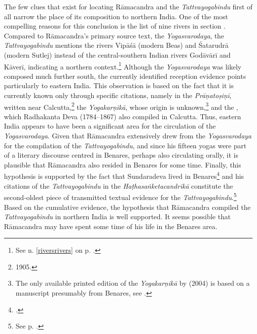 The few clues that exist for locating Rāmacandra and the \textit{Tattvayogabindu} first of all narrow the place of its composition to northern India. One of the most compelling reasons for this conclusion is the list of nine rivers in section . Compared to Rāmacandra's primary source text, the \textit{Yogasvarodaya}, the \emph{Tattvayogabindu} mentions the rivers Vipāśā (modern Beas) and Śatarudrā (modern Sutlej) instead of the central-southern Indian rivers Godāvārī and Kāverī, indicating a northern context.\footnote{See n. \ref{riversrivers} on p. \pageref{riversrivers}.} Although the \emph{Yogasvarodaya} was likely composed much further south, the currently identified reception evidence points particularly to eastern India. This observation is based on the fact that it is currently known only through specific citations, namely in the \textit{Prāṇatoṣiṇī}, written near Calcutta,\footnote{\citeauthor{shastri1905} 1905.} the \emph{Yogakarṇikā}, whose origin is unknown,\footnote{The only available printed edition of the \emph{Yogakarṇikā} by \citeauthor{yogakarnika} (2004) is based on a manuscript presumably from Benares, see \citeauthor[2004: ]{yogakarnika}.} and the , which Radhakanta Deva (1784–1867) also compiled in Calcutta. Thus, eastern India appears to have been a significant area for the circulation of the \textit{Yogasvarodaya}.
Given that Rāmacandra extensively drew from the \textit{Yogasvarodaya} for the compilation of the \textit{Tattvayogabindu}, and since his fifteen yogas were part of a literary discourse centred in Benares, perhaps also circulating orally, it is plausible that Rāmacandra also resided in Benares for some time. Finally, this hypothesis is supported by the fact that Sundaradeva lived in Benares\footnote{\citeauthor[2018: 123]{birch2018proliferation}.} and his citations of the \emph{Tattvayogabindu} in the \emph{Haṭhasaṅketacandrikā} constitute the second-oldest piece of transmitted textual evidence for the \emph{Tattvayogabindu}.\footnote{See p. \pageref{dating}.} Based on the cumulative evidence, the hypothesis that Rāmacandra compiled the \emph{Tattvayogabindu} in northern India is well supported. It seems possible that Rāmacandra may have spent some time of his life in the Benares area. 

